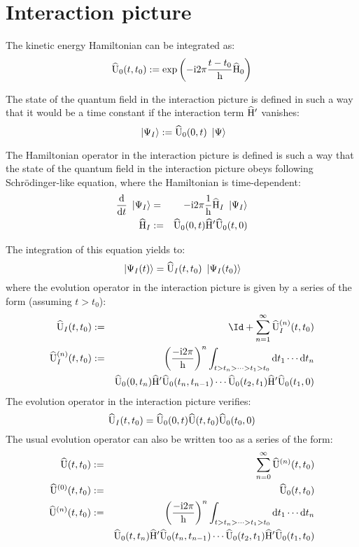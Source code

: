 \section{Interaction picture}

The kinetic energy Hamiltonian can be integrated as:
\begin{equation*}
\widehat{\mathrm U}_0({t},{t_0}) := \mathrm{exp} \left( {- \mathrm{i} 2 \pi \frac{t - t_0} {\mathrm h} \widehat{\mathrm H}_0} \right)
\end{equation*}

The state of the quantum field in the interaction picture is defined in such a way that it would be a time constant if the interaction term $\widehat{\mathrm H}'$ vanishes:
\begin{equation*}
\ \left|{\Psi_I}\right\rangle := \widehat{\mathrm U}_0({0},{t}) \ \left|{\Psi}\right\rangle
\end{equation*}

The Hamiltonian operator in the interaction picture is defined is such a way that the state of the quantum field in the interaction picture obeys following Schrödinger-like equation, where the Hamiltonian is time-dependent:
\begin{eqnarray*}
\frac{\mathrm d}{\mathrm dt} \ \left|{\Psi_I}\right\rangle & = & -\mathrm{i} 2 \pi \frac 1 {\mathrm h} \widehat{\mathrm H}_I \ \left|{\Psi_I}\right\rangle \\
\widehat{\mathrm H}_I & := & \widehat{\mathrm U}_0({0},{t}) \widehat{\mathrm H}' \widehat{\mathrm U}_0({t},{0})
\end{eqnarray*}

The integration of this equation yields to:
\begin{equation*}
\ \left|{\Psi_I(t)}\right\rangle = \widehat{\mathrm U}_I({t},{t_0}) \ \left|{\Psi_I({t_0})}\right\rangle \\
\end{equation*}
where the evolution operator in the interaction picture is given by a series of the form (assuming $t > t_0$):
\begin{eqnarray*}
\UopI t {t_0} & \eqdef & \Id + \sum_{n=1}^\infty \UopIn n t {t_0} \\
\UopIn n t {t_0} & \eqdef & \left( \frac{-\i 2 \pi} \h \right)^n \int_{t > t_n > \dotsb > t_1 > t_0} \dt_1 \dotsm \dt_n \\
&& \UopK 0 {t_n} \Hop' \UopK {t_n} {t_{n-1}} \dotsm \UopK {t_2} {t_1} \Hop' \UopK {t_1} 0
\end{eqnarray*}
The evolution operator in the interaction picture verifies:
\begin{equation*}
\widehat{\mathrm U}_I({t},{t_0}) = \widehat{\mathrm U}_0({0},{t}) \widehat{\mathrm U}({t},{t_0}) \widehat{\mathrm U}_0({t_0},{0})
\end{equation*}
The usual evolution operator can also be written too as a series of the form:
\begin{eqnarray*}
\widehat{\mathrm U}({t},{t_0}) & := & \sum_{n=0}^\infty \widehat{\mathrm U}^{({n})}({t},{t_0}) \\
\widehat{\mathrm U}^{({0})}({t},{t_0}) & := & \widehat{\mathrm U}_0({t},{t_0}) \\
\widehat{\mathrm U}^{({n})}({t},{t_0}) & := & \left( \frac{-\mathrm{i} 2 \pi} {\mathrm h} \right)^n \int_{t > t_n > \dotsb > t_1 > t_0} \mathrm dt_1 \dotsm \mathrm dt_n \\
&& \widehat{\mathrm U}_0({t},{t_n}) \widehat{\mathrm H}' \widehat{\mathrm U}_0({t_n},{t_{n-1}}) \dotsm \widehat{\mathrm U}_0({t_2},{t_1}) \widehat{\mathrm H}' \widehat{\mathrm U}_0({t_1},{t_0})
\end{eqnarray*}

